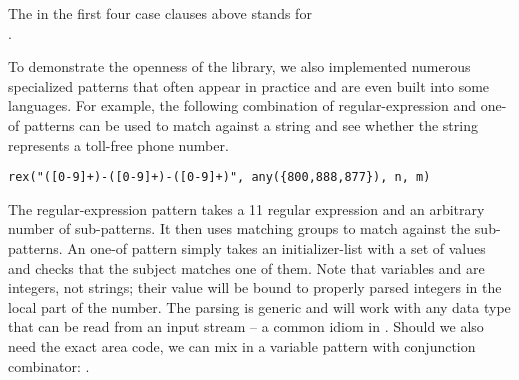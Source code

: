 \noindent
The  in the first four case clauses above stands for \\ %
. %

To demonstrate the openness of the library, we also implemented numerous 
specialized patterns that often appear in practice and are even built into some 
languages. For example, the following combination of regular-expression and one-of 
patterns can be used to match against a string and see whether the string 
represents a toll-free phone number. 

\begin{lstlisting}
rex("([0-9]+)-([0-9]+)-([0-9]+)", any({800,888,877}), n, m)
\end{lstlisting}

\noindent
The regular-expression pattern takes a \Cpp{}11 regular expression and an 
arbitrary number of sub-patterns. It then uses matching groups to match against 
the sub-patterns. An one-of pattern simply takes an initializer-list with a set of 
values and checks that the subject matches one of them. Note that variables 
 and  are integers, not strings; their value will be bound to 
properly parsed integers in the local part of the number. The parsing is generic 
and will work with any data type that can be read from an input stream -- a 
common idiom in \Cpp{}. Should we also need the exact area code, we can mix in a 
variable pattern with conjunction combinator: .

